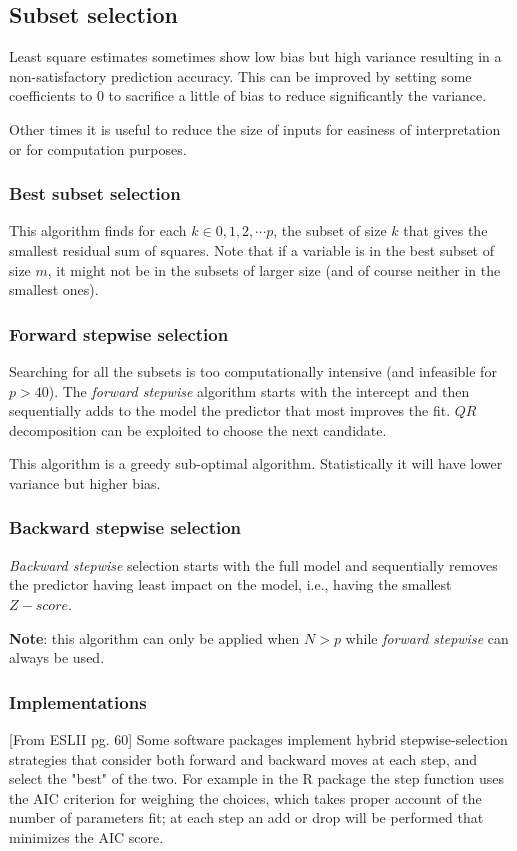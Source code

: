 \documentclass[12pt, letterpaper]{article}
\theoremstyle{definition}
\begin{document}
\subsection{Subset selection}
Least square estimates sometimes show low bias but high variance resulting in a non-satisfactory prediction accuracy. This can be improved by setting some coefficients to $0$ to sacrifice a little of bias to reduce significantly the variance.

Other times it is useful to reduce the size of inputs for easiness of interpretation or for computation purposes.

\subsubsection{Best subset selection}
This algorithm finds for each $k \in {0,1,2,	\cdots p}$, the subset of size $k$ that gives the smallest residual sum of squares. Note that if a variable is in the best subset of size $m$, it might not be in the subsets of larger size (and of course neither in the smallest ones).

\subsubsection{Forward stepwise selection}
Searching for all the subsets is too computationally intensive (and infeasible for $p>40$). The \textit{forward stepwise} algorithm starts with the intercept and then sequentially adds to the model the predictor that most improves the fit. $QR$ decomposition can be exploited to choose the next candidate.

This algorithm is a greedy sub-optimal algorithm. Statistically it will have lower variance but higher bias.

\subsubsection{Backward stepwise selection}
\textit{Backward stepwise} selection starts with the full model and sequentially removes the predictor having least impact on the model, i.e., having the smallest $Z-score$.

\textbf{Note}: this algorithm can only be applied when $N>p$ while \textit{forward stepwise} can always be used.

\subsubsection{Implementations}
[From ESLII pg. 60]
Some software packages implement hybrid stepwise-selection strategies that consider both forward and backward moves at each step, and select the "best" of the two. For example in the R package the step function uses the AIC criterion for weighing the choices, which takes proper account of the number of parameters fit; at each step an add or drop will be performed that minimizes the AIC score.
\end{document}
